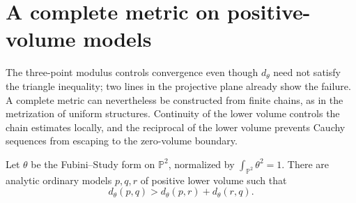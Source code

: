 \section{A complete metric on positive-volume models}
\label{sec:model-volume-metrization}

The three-point modulus controls convergence even though $d_\theta$ need not satisfy the triangle inequality; two lines in the projective plane already show the failure. A complete metric can nevertheless be constructed from finite chains, as in the metrization of uniform structures. Continuity of the lower volume controls the chain estimates locally, and the reciprocal of the lower volume prevents Cauchy sequences from escaping to the zero-volume boundary.

\begin{example}\label{ex:model-comparison-triangle-failure}
Let $\theta$ be the Fubini--Study form on $\mathbb P^2$, normalized by $\int_{\mathbb P^2}\theta^2=1$. There are analytic ordinary models $p,q,r$ of positive lower volume such that
\[
 d_\theta(p,q)>d_\theta(p,r)+d_\theta(r,q).
\]
\end{example}
